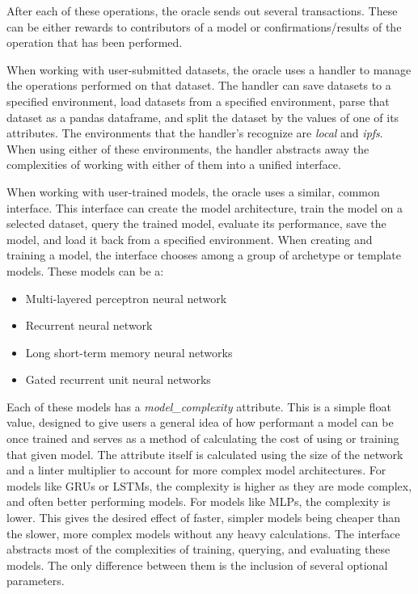 \documentclass{article}
\begin{document}
After each of these operations, the oracle sends out several transactions.  These can be either rewards to contributors
of a model or confirmations/results of the operation that has been performed.

When working with user-submitted datasets, the oracle uses a handler to manage the operations performed on that dataset.
The handler can save datasets to a specified environment, load datasets from a specified environment, parse that dataset
as a pandas dataframe, and split the dataset by the values of one of its attributes.  The environments that the handler's
recognize are \textit{local} and \textit{ipfs}.  When using either of these environments, the handler abstracts away the
complexities of working with either of them into a unified interface.

When working with user-trained models, the oracle uses a similar, common interface.  This interface can create the model
architecture, train the model on a selected dataset, query the trained model, evaluate its performance, save the model,
and load it back from a specified environment.  When creating and training a model, the interface chooses among a group of
archetype or template models.  These models can be a:

\begin{itemize}
    \item Multi-layered perceptron neural network
    \item Recurrent neural network
    \item Long short-term memory neural networks
    \item Gated recurrent unit neural networks
\end{itemize}

Each of these models has a \textit{model\_complexity} attribute.  This is a simple float value, designed to give users
a general idea of how performant a model can be once trained and serves as a method of calculating the cost of using
or training that given model.  The attribute itself is calculated using the size of the network and a linter multiplier to
account for more complex model architectures.  For models like GRUs or LSTMs, the complexity is higher as they are mode complex, and often
better performing models.  For models like MLPs, the complexity is lower.  This gives the desired effect of faster, simpler
models being cheaper than the slower, more complex models without any heavy calculations.   The interface abstracts most
of the complexities of training, querying, and evaluating these models.  The only difference between them is the inclusion
of several optional parameters.
\end{document}
